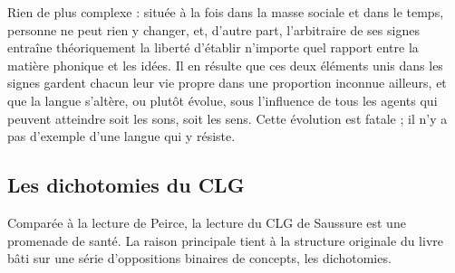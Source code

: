 \begin{lecture}{}
Rien de plus complexe : située à la fois dans la masse sociale et dans le temps, personne ne peut rien y changer, et, d’autre part, l’arbitraire de ses signes entraîne théoriquement la liberté d’établir n’importe quel rapport entre la matière phonique et les idées. Il en résulte que ces deux éléments unis dans les signes gardent chacun leur vie propre dans une proportion inconnue ailleurs, et que la langue s’altère, ou plutôt évolue, sous l’influence de tous les agents qui peuvent atteindre soit les sons, soit les sens. Cette évolution est fatale ; il n’y a pas d’exemple d’une langue qui y résiste.
\end{lecture}

\subsection{Les dichotomies du CLG}
Comparée à la lecture de Peirce, la lecture du CLG de Saussure est une promenade de santé. La raison principale tient à la structure originale du livre bâti sur une série d’oppositions binaires de concepts, les dichotomies.

